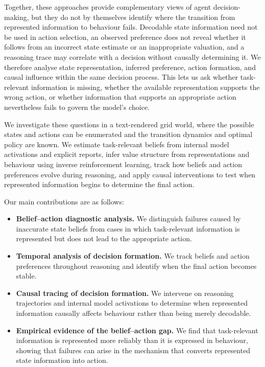 \documentclass{article}
\begin{document}
Together, these approaches provide complementary views of agent decision-making, but they do not by themselves identify where the transition from represented information to behaviour fails. Decodable state information need not be used in action selection, an observed preference does not reveal whether it follows from an incorrect state estimate or an inappropriate valuation, and a reasoning trace may correlate with a decision without causally determining it. We therefore analyse state representation, inferred preference, action formation, and causal influence within the same decision process. This lets us ask whether task-relevant information is missing, whether the available representation supports the wrong action, or whether information that supports an appropriate action nevertheless fails to govern the model's choice.

We investigate these questions in a text-rendered grid world, where the possible states and actions can be enumerated and the transition dynamics and optimal policy are known. We estimate task-relevant beliefs from internal model activations and explicit reports, infer value structure from representations and behaviour using inverse reinforcement learning, track how beliefs and action preferences evolve during reasoning, and apply causal interventions to test when represented information begins to determine the final action.

Our main contributions are as follows:
\begin{itemize}[
leftmargin=1.4em,
label=\raisebox{0.35ex}{\rule{0.75ex}{0.75ex}},
labelsep=0.5em
]
\item \textbf{Belief--action diagnostic analysis.}
We distinguish failures caused by inaccurate state beliefs from cases in which task-relevant information is represented but does not lead to the appropriate action.

\item \textbf{Temporal analysis of decision formation.}
We track beliefs and action preferences throughout reasoning and identify when the final action becomes stable.

\item \textbf{Causal tracing of decision formation.}
We intervene on reasoning trajectories and internal model activations to determine when represented information causally affects behaviour rather than being merely decodable.

\item \textbf{Empirical evidence of the belief--action gap.}
We find that task-relevant information is represented more reliably than it is expressed in behaviour, showing that failures can arise in the mechanism that converts represented state information into action.
\end{itemize}
\end{document}
